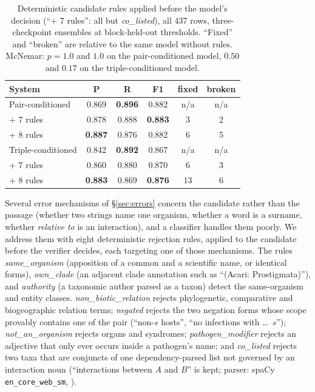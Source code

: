 \documentclass[11pt]{article}
\begin{document}
\begin{table}[t]\centering\small
\setlength{\tabcolsep}{3.6pt}
\begin{tabular}{lccccc}
\toprule
System & P & R & F1 & fixed & broken \\
\midrule
Pair-conditioned          & 0.869 & \textbf{0.896} & 0.882 & n/a & n/a \\
\quad + 7 rules           & 0.878 & 0.888 & \textbf{0.883} & 3 & 2 \\
\quad + 8 rules           & \textbf{0.887} & 0.876 & 0.882 & 6 & 5 \\
\midrule
Triple-conditioned        & 0.842 & \textbf{0.892} & 0.867 & n/a & n/a \\
\quad + 7 rules           & 0.860 & 0.880 & 0.870 & 6 & 3 \\
\quad + 8 rules           & \textbf{0.883} & 0.869 & \textbf{0.876} & 13 & 6 \\
\bottomrule
\end{tabular}
\caption{Deterministic candidate rules applied before the model's decision (``+ 7 rules'': all but
\emph{co\_listed}), all 437 rows,
three-checkpoint ensembles at block-held-out thresholds. ``Fixed'' and ``broken'' are relative to
the same model without rules. McNemar: $p = 1.0$ and $1.0$ on the pair-conditioned model, $0.50$
and $0.17$ on the triple-conditioned model.}
\label{tab:rules}
\end{table}

Several error mechanisms of \S\ref{sec:errors} concern the candidate rather than the
passage (whether two strings name one organism, whether a word is a surname, whether
\emph{relative to} is an interaction), and a classifier handles them poorly. We address them with
eight deterministic rejection rules, applied to the candidate before the verifier decides, each
targeting one of those mechanisms. The rules \emph{same\_organism}
(apposition of a common and a scientific name, or identical forms), \emph{own\_clade} (an adjacent
clade annotation such as ``(Acari: Prostigmata)''), and \emph{authority} (a taxonomic author parsed
as a taxon) detect the same-organism and entity classes. \emph{non\_biotic\_relation} rejects
phylogenetic, comparative and biogeographic relation terms; \emph{negated} rejects the two
negation forms whose scope provably contains one of the pair (``non-$s$ hosts'', ``no infections
with \ldots\ $s$''); \emph{not\_an\_organism} rejects organs and syndromes; \emph{pathogen\_modifier}
rejects an adjective that only ever occurs inside a pathogen's name; and \emph{co\_listed} rejects
two taxa that are conjuncts of one dependency-parsed list not governed by an interaction noun
(``interactions between $A$ and $B$'' is kept; parser: spaCy \texttt{en\_core\_web\_sm},
\citealp{honnibal2020spacy}).
\end{document}
